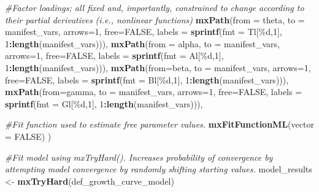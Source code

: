 \documentclass[
12pt, %
twoside,
english]{guelphthesis}
\newenvironment{Shaded}{\begin{snugshade}}{\end{snugshade}}
\newcommand{\AttributeTok}[1]{\textcolor[rgb]{0.13,0.29,0.53}{#1}}
\newcommand{\CommentTok}[1]{\textcolor[rgb]{0.56,0.35,0.01}{\textit{#1}}}
\newcommand{\ConstantTok}[1]{\textcolor[rgb]{0.56,0.35,0.01}{#1}}
\newcommand{\DecValTok}[1]{\textcolor[rgb]{0.00,0.00,0.81}{#1}}
\newcommand{\FunctionTok}[1]{\textcolor[rgb]{0.13,0.29,0.53}{\textbf{#1}}}
\newcommand{\NormalTok}[1]{#1}
\newcommand{\OtherTok}[1]{\textcolor[rgb]{0.56,0.35,0.01}{#1}}
\newcommand{\SpecialCharTok}[1]{\textcolor[rgb]{0.81,0.36,0.00}{\textbf{#1}}}
\newcommand{\StringTok}[1]{\textcolor[rgb]{0.31,0.60,0.02}{#1}}
\begin{document}
\begin{Shaded}
\begin{Highlighting}[numbers=left,,]
  \CommentTok{\#Factor loadings; all fixed and, importantly, constrained to change according to their partial derivatives (i.e., nonlinear functions) }
  \FunctionTok{mxPath}\NormalTok{(}\AttributeTok{from =} \StringTok{\textquotesingle{}theta\textquotesingle{}}\NormalTok{, }\AttributeTok{to =}\NormalTok{ manifest\_vars, }\AttributeTok{arrows=}\DecValTok{1}\NormalTok{, }\AttributeTok{free=}\ConstantTok{FALSE}\NormalTok{,  }
         \AttributeTok{labels =} \FunctionTok{sprintf}\NormalTok{(}\AttributeTok{fmt =} \StringTok{\textquotesingle{}Tl[\%d,1]\textquotesingle{}}\NormalTok{, }\DecValTok{1}\SpecialCharTok{:}\FunctionTok{length}\NormalTok{(manifest\_vars))),}
  \FunctionTok{mxPath}\NormalTok{(}\AttributeTok{from =} \StringTok{\textquotesingle{}alpha\textquotesingle{}}\NormalTok{, }\AttributeTok{to =}\NormalTok{ manifest\_vars, }\AttributeTok{arrows=}\DecValTok{1}\NormalTok{, }\AttributeTok{free=}\ConstantTok{FALSE}\NormalTok{,  }
         \AttributeTok{labels =} \FunctionTok{sprintf}\NormalTok{(}\AttributeTok{fmt =} \StringTok{\textquotesingle{}Al[\%d,1]\textquotesingle{}}\NormalTok{, }\DecValTok{1}\SpecialCharTok{:}\FunctionTok{length}\NormalTok{(manifest\_vars))), }
  \FunctionTok{mxPath}\NormalTok{(}\AttributeTok{from=}\StringTok{\textquotesingle{}beta\textquotesingle{}}\NormalTok{, }\AttributeTok{to =}\NormalTok{ manifest\_vars, }\AttributeTok{arrows=}\DecValTok{1}\NormalTok{,  }\AttributeTok{free=}\ConstantTok{FALSE}\NormalTok{,}
         \AttributeTok{labels =}  \FunctionTok{sprintf}\NormalTok{(}\AttributeTok{fmt =} \StringTok{\textquotesingle{}Bl[\%d,1]\textquotesingle{}}\NormalTok{, }\DecValTok{1}\SpecialCharTok{:}\FunctionTok{length}\NormalTok{(manifest\_vars))), }
  \FunctionTok{mxPath}\NormalTok{(}\AttributeTok{from=}\StringTok{\textquotesingle{}gamma\textquotesingle{}}\NormalTok{, }\AttributeTok{to =}\NormalTok{ manifest\_vars, }\AttributeTok{arrows=}\DecValTok{1}\NormalTok{,  }\AttributeTok{free=}\ConstantTok{FALSE}\NormalTok{,}
         \AttributeTok{labels =}  \FunctionTok{sprintf}\NormalTok{(}\AttributeTok{fmt =} \StringTok{\textquotesingle{}Gl[\%d,1]\textquotesingle{}}\NormalTok{, }\DecValTok{1}\SpecialCharTok{:}\FunctionTok{length}\NormalTok{(manifest\_vars))), }
  
  \CommentTok{\#Fit function used to estimate free parameter values. }
  \FunctionTok{mxFitFunctionML}\NormalTok{(}\AttributeTok{vector =} \ConstantTok{FALSE}\NormalTok{)}
\NormalTok{)}

\CommentTok{\#Fit model using mxTryHard(). Increases probability of convergence by attempting model convergence by randomly shifting starting values. }
\NormalTok{model\_results }\OtherTok{\textless{}{-}} \FunctionTok{mxTryHard}\NormalTok{(def\_growth\_curve\_model)}
\end{Highlighting}
\end{Shaded}
\end{document}
